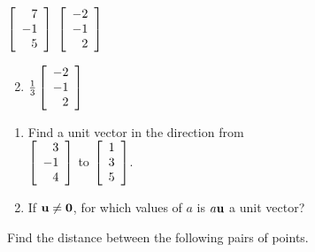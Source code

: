 \begin{multicols}{2}
\begin{ex}
\begin{exenumerate}[column-sep=-5em]
\exitem $\left[
\begin{array}{r}
7 \\
-1 \\
5
\end{array}
\right]$
\exitem $\left[
\begin{array}{r}
-2 \\
-1 \\
2
\end{array}
\right]$
\end{exenumerate}
\begin{sol}
\begin{enumerate}[label={\alph*.}]
\setcounter{enumi}{1}
\item 
$\tfrac{1}{3}\left[
\begin{array}{r}
-2 \\
-1 \\
2
\end{array}
\right]$

\end{enumerate}
\end{sol}
\end{ex}

\begin{ex}
\begin{enumerate}[label={\alph*.}]
\item Find a unit vector in the direction from \\
$\left[
\begin{array}{r}
3 \\
-1 \\
4
\end{array}
\right]$
to
$\left[
\begin{array}{r}
1\\
3 \\
5
\end{array}
\right]$.

\item If $\textbf{u} \neq \textbf{0}$, for which values of $a$ is $a\textbf{u}$ a unit vector?

\end{enumerate}
\end{ex}

\begin{ex}
Find the distance between the following pairs of points.


\end{ex}
\end{multicols}
